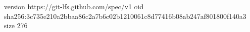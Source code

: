 version https://git-lfs.github.com/spec/v1
oid sha256:3c735e210a2bbaa86c2a7b6c02b1210061c8d77416b08ab247af801800f140a3
size 276
